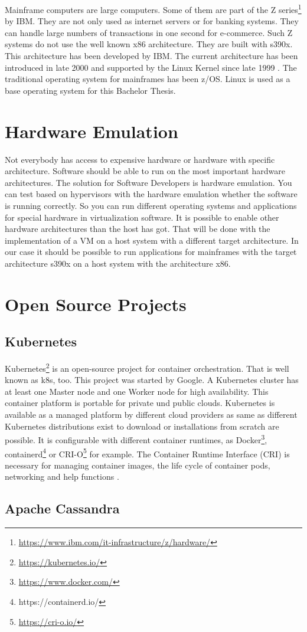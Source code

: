 Mainframe computers are large computers. Some of them are part of the Z series\footnote{\url{https://www.ibm.com/it-infrastructure/z/hardware/}} by IBM. They are not only used as internet servers or for banking systems. They can handle large numbers of transactions in one second for e-commerce\cite[~p.56]{Tanenbaum2014}. Such Z systems do not use the well known x86 architecture. They are built with s390x. This architecture has been developed by IBM. The current architecture has been introduced in late 2000 and supported by the Linux Kernel since late 1999 \cite[~p.15]{Block2019}. The traditional operating system for mainframes has been z/OS. Linux is used as a base operating system for this Bachelor Thesis.


\section{Hardware Emulation}

Not everybody has access to expensive hardware or hardware with  specific architecture. 
Software should be able to run on the most important hardware architectures. 
The solution for Software Developers is hardware emulation. 
You can test based on hypervisors with the hardware emulation whether the software is running correctly. 
So you can run different operating systems and applications for special hardware in virtualization software. 
It is possible to enable other hardware architectures than the host has got. 
That will be done with the implementation of a VM on a host system with a different target architecture\cite[~p.3]{Rosenthal2015}. 
In our case it should be possible to run applications for mainframes with the target architecture s390x on a host system with the architecture x86.

\section{Open Source Projects}

\subsection{Kubernetes}

Kubernetes\footnote{\url{https://kubernetes.io/}} is an open-source project for container orchestration. That is well known as k8s, too. This project was started by Google. A Kubernetes cluster has at least one Master node and one Worker node for high availability. This container platform is portable for private und public clouds. Kubernetes is available as a managed platform by different cloud providers as same as different Kubernetes distributions exist to download or installations from scratch are possible. It is configurable with different container runtimes, as Docker\footnote{\url{https://www.docker.com/}}, containerd\footnote{https://containerd.io/} or CRI-O\footnote{\url{https://cri-o.io/}} for example. The Container Runtime Interface (CRI) is necessary for managing container images, the life cycle of container pods, networking and help functions \cite[~p.16]{Scholl2019}. 


\subsection{Apache Cassandra}

